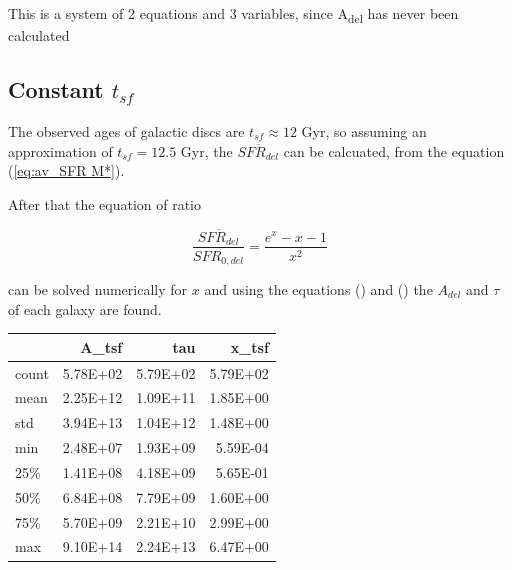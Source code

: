 \documentclass[a4paper,twocolumn]{article}
\begin{document}
This is a system of 2 equations and 3 variables, since A\textsubscript{del} has never been calculated

\subsection{Constant \(t_{sf}\)}
\label{sec:orgd5bd959}
The observed ages of galactic discs are \(t_{sf}\approx 12\) Gyr\autocite{knoxSurveyCoolWhite1999}, so assuming an approximation of \(t_{sf}=12.5\) Gyr, the \(\overline{SFR_{del}}\) can be calcuated, from the equation (\ref{eq:av_SFR M*}).

After that the equation of ratio



\begin{equation} \label{eq:ratio}
    \frac{\overline{SFR_{del}}}{SFR_{0,del}}=\frac{e^x-x-1}{x^2}
\end{equation}

can be solved numerically for \(x\) and using the equations () and () the \(A_{del}\) and \(\tau\) of each galaxy are found.

\begin{table}[hc]
\centering
\begin{tabular}{lrrr}
\toprule
{} &    A\_tsf &      tau &    x\_tsf \\
\midrule
count & 5.78E+02 & 5.79E+02 & 5.79E+02 \\
mean  & 2.25E+12 & 1.09E+11 & 1.85E+00 \\
std   & 3.94E+13 & 1.04E+12 & 1.48E+00 \\
min   & 2.48E+07 & 1.93E+09 & 5.59E-04 \\
25\%   & 1.41E+08 & 4.18E+09 & 5.65E-01 \\
50\%   & 6.84E+08 & 7.79E+09 & 1.60E+00 \\
75\%   & 5.70E+09 & 2.21E+10 & 2.99E+00 \\
max   & 9.10E+14 & 2.24E+13 & 6.47E+00 \\
\bottomrule
\end{tabular}
\end{table}
\end{document}
